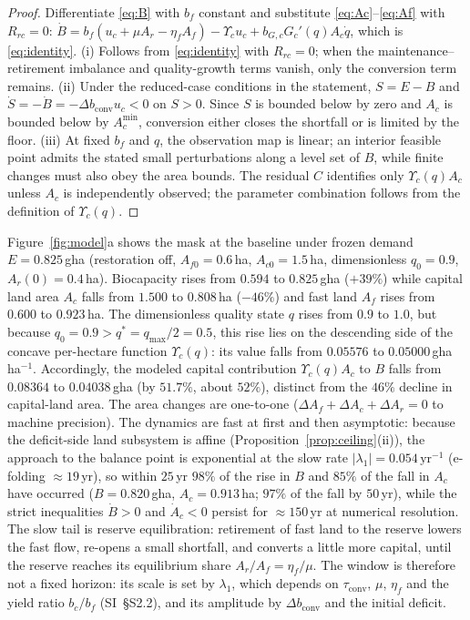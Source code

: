 \documentclass[preprint,12pt,authoryear]{elsarticle}
\newcommand{\dconv}{\Delta b_{\mathrm{conv}}}
\newcommand{\Ups}{\Upsilon_c}
\newcommand{\Acmin}{A_c^{\min}}
\newcommand{\tconv}{\tau_{\mathrm{conv}}}
\begin{document}
\begin{proof}
Differentiate \eqref{eq:B} with $b_f$ constant and substitute \eqref{eq:Ac}--\eqref{eq:Af} with $R_{rc}=0$: $\dot B=b_f(u_c+\mu A_r-\eta_fA_f)-\Ups u_c+b_{G,c}G_c'(q)A_c\dot q$, which is \eqref{eq:identity}. (i) Follows from \eqref{eq:identity} with $R_{rc}=0$; when the maintenance--retirement imbalance and quality-growth terms vanish, only the conversion term remains. (ii) Under the reduced-case conditions in the statement, $S=E-B$ and $\dot S=-\dot B=-\dconv u_c<0$ on $S>0$. Since $S$ is bounded below by zero and $A_c$ is bounded below by $\Acmin$, conversion either closes the shortfall or is limited by the floor. (iii) At fixed $b_f$ and $q$, the observation map is linear; an interior feasible point admits the stated small perturbations along a level set of $B$, while finite changes must also obey the area bounds. The residual $C$ identifies only $\Ups(q)A_c$ unless $A_c$ is independently observed; the parameter combination follows from the definition of $\Ups(q)$.
\end{proof}

Figure~\ref{fig:model}a shows the mask at the baseline under frozen demand $E=0.825$\,gha (restoration off, $A_{f0}=0.6$\,ha, $A_{c0}=1.5$\,ha, dimensionless $q_0=0.9$, $A_r(0)=0.4$\,ha). Biocapacity rises from $0.594$ to $0.825$\,gha ($+39\%$) while capital land area $A_c$ falls from $1.500$ to $0.808$\,ha ($-46\%$) and fast land $A_f$ rises from $0.600$ to $0.923$\,ha. The dimensionless quality state $q$ rises from $0.9$ to $1.0$, but because $q_0=0.9>q^*=q_{\max}/2=0.5$, this rise lies on the descending side of the concave per-hectare function $\Ups(q)$: its value falls from $0.05576$ to $0.05000$\,gha\,ha$^{-1}$. Accordingly, the modeled capital contribution $\Ups(q)A_c$ to $B$ falls from $0.08364$ to $0.04038$\,gha (by $51.7\%$, about $52\%$), distinct from the $46\%$ decline in capital-land area. The area changes are one-to-one ($\Delta A_f+\Delta A_c+\Delta A_r=0$ to machine precision). The dynamics are fast at first and then asymptotic: because the deficit-side land subsystem is affine (Proposition~\ref{prop:ceiling}(ii)), the approach to the balance point is exponential at the slow rate $|\lambda_1|=0.054\,\mathrm{yr}^{-1}$ (e-folding $\approx19$\,yr), so within $25$\,yr $98\%$ of the rise in $B$ and $85\%$ of the fall in $A_c$ have occurred ($B=0.820$\,gha, $A_c=0.913$\,ha; $97\%$ of the fall by $50$\,yr), while the strict inequalities $\dot B>0$ and $\dot A_c<0$ persist for $\approx150$\,yr at numerical resolution. The slow tail is reserve equilibration: retirement of fast land to the reserve lowers the fast flow, re-opens a small shortfall, and converts a little more capital, until the reserve reaches its equilibrium share $A_r/A_f=\eta_f/\mu$. The window is therefore not a fixed horizon: its scale is set by $\lambda_1$, which depends on $\tconv$, $\mu$, $\eta_f$ and the yield ratio $b_c/b_f$ (SI~\S S2.2), and its amplitude by $\dconv$ and the initial deficit.
\end{document}
